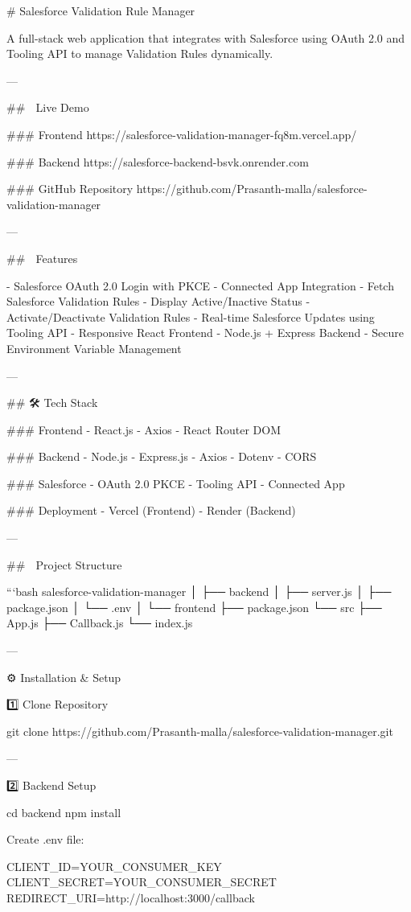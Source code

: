 
# Salesforce Validation Rule Manager

A full-stack web application that integrates with Salesforce using OAuth 2.0 and Tooling API to manage Validation Rules dynamically.

---

## 🚀 Live Demo

### Frontend
https://salesforce-validation-manager-fq8m.vercel.app/

### Backend
https://salesforce-backend-bsvk.onrender.com

### GitHub Repository
https://github.com/Prasanth-malla/salesforce-validation-manager

---

## 📌 Features

- Salesforce OAuth 2.0 Login with PKCE
- Connected App Integration
- Fetch Salesforce Validation Rules
- Display Active/Inactive Status
- Activate/Deactivate Validation Rules
- Real-time Salesforce Updates using Tooling API
- Responsive React Frontend
- Node.js + Express Backend
- Secure Environment Variable Management

---

## 🛠️ Tech Stack

### Frontend
- React.js
- Axios
- React Router DOM

### Backend
- Node.js
- Express.js
- Axios
- Dotenv
- CORS

### Salesforce
- OAuth 2.0 PKCE
- Tooling API
- Connected App

### Deployment
- Vercel (Frontend)
- Render (Backend)

---

## 📂 Project Structure

```bash
salesforce-validation-manager
│
├── backend
│   ├── server.js
│   ├── package.json
│   └── .env
│
└── frontend
    ├── package.json
    └── src
        ├── App.js
        ├── Callback.js
        └── index.js


---

⚙️ Installation & Setup

1️⃣ Clone Repository

git clone https://github.com/Prasanth-malla/salesforce-validation-manager.git


---

2️⃣ Backend Setup

cd backend
npm install

Create .env file:

CLIENT_ID=YOUR_CONSUMER_KEY
CLIENT_SECRET=YOUR_CONSUMER_SECRET
REDIRECT_URI=http://localhost:3000/callback

